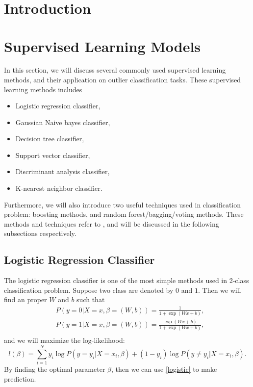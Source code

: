 \documentclass[english]{article}
\author{\authorthing}
\title{\textbf{\titlemark}}
\begin{document}
\maketitle


\section{Introduction}

\section{Supervised Learning Models}
\par In this section, we will discuss several commonly used supervised learning methods, and their application on outlier classification tasks. These supervised learning methods includes
\begin{itemize}
	\item Logistic regression classifier,
	\item Gaussian Naive bayes classifier,
	\item Decision tree classifier,
	\item Support vector classifier,
	\item Discriminant analysis classifier,
	\item K-nearest neighbor classifier.
\end{itemize}
\par Furthermore, we will also introduce two useful techniques used in classification problem: boosting methods, and random forest/bagging/voting methods. These methods and techniques refer to \cite{scikit-learn}\cite{friedman2001elements}, and will be discussed in the following subsections respectively.

\subsection{Logistic Regression Classifier}
\par The logistic regression classifier is one of the most simple methods used in 2-class classification problem. Suppose two class are denoted by $0$ and $1$. Then we will find an proper $W$ and $b$ such that
\begin{equation}\label{logistic}
	\begin{aligned}
		&P(y=0|X=x, \beta=(W, b)) = \frac{1}{1 + \exp(Wx+b)},\\
		&P(y=1|X=x, \beta=(W, b)) = \frac{\exp(Wx+b)}{1 + \exp(Wx+b)},\\
	\end{aligned}
\end{equation}
and we will maximize the log-likelihood:
\begin{equation}
	l(\beta) = \sum_{i=1}^{N}y_{i}\log P(y=y_{i}|X=x_{i}, \beta) + (1-y_{i})\log P(y\neq y_{i}|X=x_{i}, \beta).
\end{equation}
By finding the optimal parameter $\beta$, then we can use \eqref{logistic} to make prediction.
\end{document}
